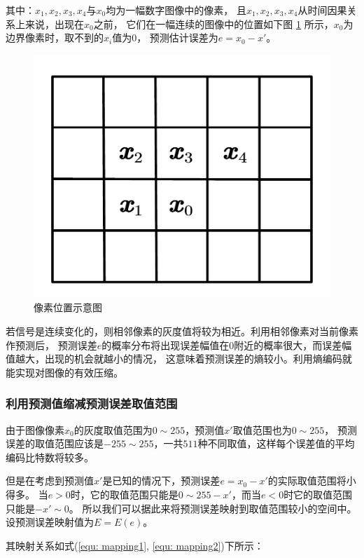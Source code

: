 \documentclass[12pt,a4paper]{article}%
\begin{document}
其中：$x_1, x_2, x_3, x_4$与$x_0$均为一幅数字图像中的像素，
且$x_1, x_2, x_3, x_4$从时间因果关系上来说，出现在$x_0$之前，
它们在一幅连续的图像中的位置如下图 \ref{fig: pos of pixel} 所示，$x_0$为边界像素时，取不到的$x_i$值为$0$，
预测估计误差为$e=x_0-x'$。
\begin{figure}[thb] \centering
    \includegraphics[scale=0.3,trim=0 15 0 20,clip]{imgs/pixel pos.pdf}
    \caption{像素位置示意图}
    \label{fig: pos of pixel}
\end{figure}

若信号是连续变化的，则相邻像素的灰度值将较为相近。利用相邻像素对当前像素作预测后，
预测误差$e$的概率分布将出现误差幅值在$0$附近的概率很大，而误差幅值越大，出现的机会就越小的情况，
这意味着预测误差的熵较小。利用熵编码就能实现对图像的有效压缩。

\subsubsection{利用预测值缩减预测误差取值范围}
由于图像像素$x_0$的灰度取值范围为$0\sim 255$，预测值$x'$取值范围也为$0\sim 255$，
预测误差的取值范围应该是$-255\sim 255$，一共$511$种不同取值，这样每个误差值的平均编码比特数将较多。

但是在考虑到预测值$x'$是已知的情况下，预测误差$e=x_0-x'$的实际取值范围将小得多。
当$e>0$时，它的取值范围只能是$0\sim 255-x'$，而当$e<0$时它的取值范围只能是$-x'\sim 0$。
所以我们可以据此来将预测误差映射到取值范围较小的空间中。设预测误差映射值为$E=E(e)$。

其映射关系如式(\ref{equ: mapping1}, \ref{equ: mapping2})下所示：
\end{document}
